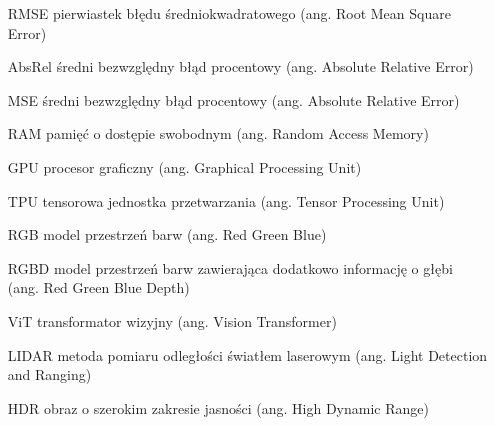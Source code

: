 \flushleft



\begin{itemize}[noitemsep,topsep=0pt,parsep=0pt,partopsep=0pt,labelwidth=3cm,align=left,itemindent=3cm]
\item[RMSE] pierwiastek błędu średniokwadratowego (ang. Root Mean Square Error)
    \item[AbsRel] średni bezwzględny błąd procentowy (ang. Absolute Relative Error)
    \item[MSE] średni bezwzględny błąd procentowy (ang. Absolute Relative Error)
    \item[RAM] pamięć o dostępie swobodnym (ang. Random Access Memory)
    \item[GPU] procesor graficzny (ang. Graphical Processing Unit)
    \item[TPU] tensorowa jednostka przetwarzania (ang. Tensor Processing Unit)
    \item[RGB] model przestrzeń barw (ang. Red Green Blue)
    \item[RGBD] model przestrzeń barw zawierająca dodatkowo informację o głębi (ang. Red Green Blue Depth)
    \item[ViT] transformator wizyjny (ang. Vision Transformer)
    \item[LIDAR] metoda pomiaru odległości światłem laserowym (ang. Light Detection and Ranging)
    \item[HDR] obraz o szerokim zakresie jasności (ang. High Dynamic Range)
\end{itemize}

